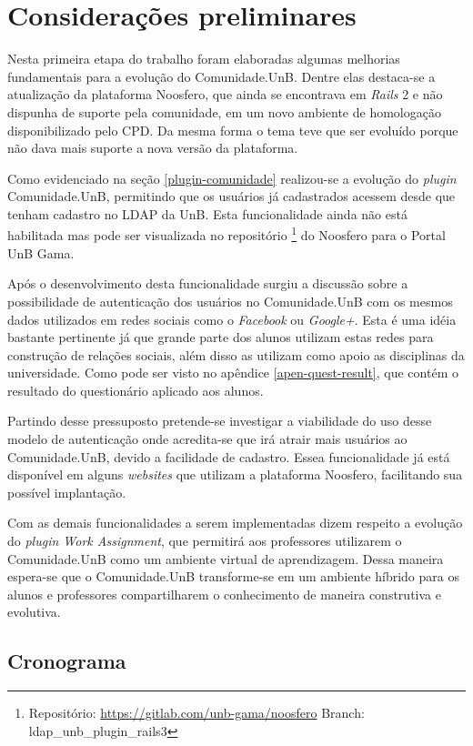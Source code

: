 \chapter{Considerações preliminares}
\label{consideracoes-preliminares}

Nesta primeira etapa do trabalho foram elaboradas algumas melhorias fundamentais para a evolução do Comunidade.UnB. Dentre elas destaca-se a atualização da plataforma Noosfero, que ainda se encontrava em \textit{Rails} 2 e não dispunha de suporte pela comunidade, em um novo ambiente de homologação disponibilizado pelo CPD. Da mesma forma o tema teve que ser evoluído porque não dava mais suporte a nova versão da plataforma.

Como evidenciado na seção \ref{plugin-comunidade} realizou-se a evolução do \textit{plugin} Comunidade.UnB, permitindo que os usuários já cadastrados acessem desde que tenham cadastro no LDAP da UnB. Esta funcionalidade ainda não está habilitada mas pode ser visualizada no repositório \footnote{Repositório: \url{https://gitlab.com/unb-gama/noosfero} Branch: ldap\_unb\_plugin\_rails3 } do Noosfero para o Portal UnB Gama.

Após o desenvolvimento desta funcionalidade surgiu a discussão sobre a possibilidade de autenticação dos usuários no Comunidade.UnB com os mesmos dados utilizados em redes sociais como o \textit{Facebook} ou \textit{Google+}. Esta é uma idéia bastante pertinente já que grande parte dos alunos utilizam estas redes para construção de relações sociais, além disso as utilizam como apoio as disciplinas da universidade. Como pode ser visto no apêndice \ref{apen-quest-result}, que contém o resultado do questionário aplicado aos alunos.

Partindo desse pressuposto pretende-se investigar a viabilidade do uso desse modelo de autenticação onde acredita-se que irá atrair mais usuários ao Comunidade.UnB, devido a facilidade de cadastro. Essea funcionalidade já está disponível em alguns \textit{websites} que utilizam a plataforma Noosfero, facilitando sua possível implantação.

Com as demais funcionalidades a serem implementadas dizem respeito a evolução do \textit{plugin Work Assignment}, que permitirá aos professores utilizarem o Comunidade.UnB como um ambiente virtual de aprendizagem. Dessa maneira espera-se que o Comunidade.UnB transforme-se em um ambiente híbrido para os alunos e professores compartilharem o conhecimento de maneira construtiva e evolutiva.

\section{Cronograma}

